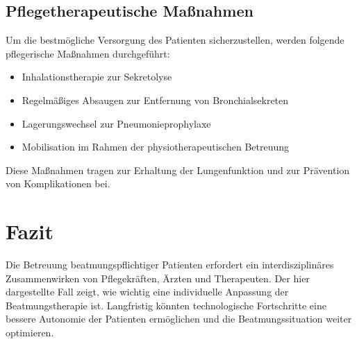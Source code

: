 \documentclass[a4paper,12pt]{article}
\begin{document}
\subsection{Pflegetherapeutische Maßnahmen}
Um die bestmögliche Versorgung des Patienten sicherzustellen, werden folgende
pflegerische Maßnahmen durchgeführt:
\begin{itemize}
	\item Inhalationstherapie zur Sekretolyse
	\item Regelmäßiges Absaugen zur Entfernung von Bronchialsekreten
	\item Lagerungswechsel zur Pneumonieprophylaxe
	\item Mobilisation im Rahmen der physiotherapeutischen Betreuung
\end{itemize}
Diese Maßnahmen tragen zur Erhaltung der Lungenfunktion und zur Prävention von
Komplikationen bei.

\section{Fazit}
Die Betreuung beatmungspflichtiger Patienten erfordert ein interdisziplinäres
Zusammenwirken von Pflegekräften, Ärzten und Therapeuten. Der hier dargestellte
Fall zeigt, wie wichtig eine individuelle Anpassung der Beatmungstherapie ist.
Langfristig könnten technologische Fortschritte eine bessere Autonomie der Patienten
ermöglichen und die Beatmungssituation weiter optimieren.

\newpage


\end{document}
